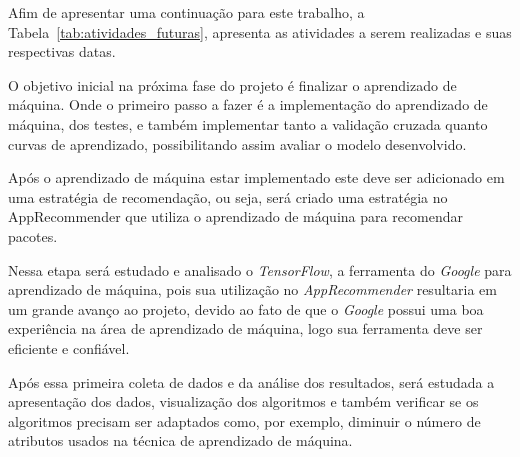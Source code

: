 Afim de apresentar uma continuação para este trabalho, a Tabela~\ref{tab:atividades_futuras},
apresenta as atividades a serem realizadas e suas respectivas datas.

\begin{table}[h]
\centering
{}
\caption{Atividades a serem realizadas}
\label{tab:atividades_futuras}
\end{table}

O objetivo inicial na próxima fase do projeto é finalizar o aprendizado
de máquina. Onde o primeiro passo a fazer é a implementação do aprendizado
de máquina, dos testes, e também implementar tanto a validação cruzada quanto
curvas de aprendizado, possibilitando assim avaliar o modelo desenvolvido.

Após o aprendizado de máquina estar implementado este deve ser adicionado
em uma estratégia de recomendação, ou seja, será criado uma estratégia
no AppRecommender que utiliza o aprendizado de máquina para recomendar
pacotes.

Nessa etapa será estudado e analisado o \textit{TensorFlow}, a ferramenta do
\textit{Google} para aprendizado de máquina, pois sua utilização no
\textit{AppRecommender} resultaria em um grande avanço ao projeto, devido ao fato de que o
\textit{Google} possui uma boa experiência na área de aprendizado de máquina,
logo sua ferramenta deve ser eficiente e confiável.

Após essa primeira coleta de dados e da análise dos resultados, será
estudada a apresentação dos dados, visualização dos algoritmos e também
verificar se os algoritmos precisam ser adaptados como, por exemplo,
diminuir o número de atributos usados na técnica de aprendizado de máquina.

